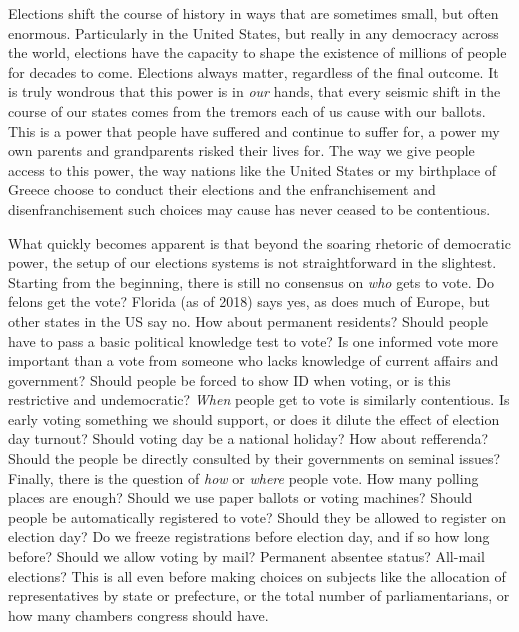 \documentclass[12pt,twoside]{reedthesis}
\begin{document}
  Elections shift the course of history in ways that are sometimes small,
  but often enormous. Particularly in the United States, but really in any
  democracy across the world, elections have the capacity to shape the
  existence of millions of people for decades to come. Elections always
  matter, regardless of the final outcome. It is truly wondrous that this
  power is in \emph{our} hands, that every seismic shift in the course of
  our states comes from the tremors each of us cause with our ballots.
  This is a power that people have suffered and continue to suffer for, a
  power my own parents and grandparents risked their lives for. The way we
  give people access to this power, the way nations like the United States
  or my birthplace of Greece choose to conduct their elections and the
  enfranchisement and disenfranchisement such choices may cause has never
  ceased to be contentious.
  
  What quickly becomes apparent is that beyond the soaring rhetoric of
  democratic power, the setup of our elections systems is not
  straightforward in the slightest. Starting from the beginning, there is
  still no consensus on \emph{who} gets to vote. Do felons get the vote?
  Florida (as of 2018) says yes, as does much of Europe, but other states
  in the US say no. How about permanent residents? Should people have to
  pass a basic political knowledge test to vote? Is one informed vote more
  important than a vote from someone who lacks knowledge of current
  affairs and government? Should people be forced to show ID when voting,
  or is this restrictive and undemocratic? \emph{When} people get to vote
  is similarly contentious. Is early voting something we should support,
  or does it dilute the effect of election day turnout? Should voting day
  be a national holiday? How about refferenda? Should the people be
  directly consulted by their governments on seminal issues? Finally,
  there is the question of \emph{how} or \emph{where} people vote. How
  many polling places are enough? Should we use paper ballots or voting
  machines? Should people be automatically registered to vote? Should they
  be allowed to register on election day? Do we freeze registrations
  before election day, and if so how long before? Should we allow voting
  by mail? Permanent absentee status? All-mail elections? This is all even
  before making choices on subjects like the allocation of representatives
  by state or prefecture, or the total number of parliamentarians, or how
  many chambers congress should have.
  
\end{document}
